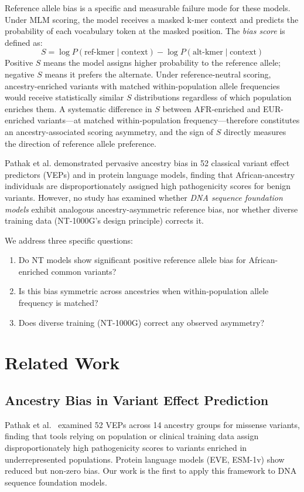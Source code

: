 \documentclass[conference]{IEEEtran}
\begin{document}
Reference allele bias is a specific and measurable failure mode for these
models. Under MLM scoring, the model receives a masked k-mer context and
predicts the probability of each vocabulary token at the masked position. The
\emph{bias score} is defined as:
\begin{equation}
  S = \log P(\text{ref-kmer} \mid \text{context})
      - \log P(\text{alt-kmer} \mid \text{context})
  \label{eq:bias}
\end{equation}
Positive $S$ means the model assigns higher probability to the reference
allele; negative $S$ means it prefers the alternate. Under reference-neutral
scoring, ancestry-enriched variants with matched within-population allele
frequencies would receive statistically similar $S$ distributions regardless
of which population enriches them. A systematic difference in $S$ between
AFR-enriched and EUR-enriched variants---at matched within-population
frequency---therefore constitutes an ancestry-associated scoring asymmetry,
and the sign of $S$ directly measures the direction of reference allele
preference.

Pathak et al. \cite{pathak_2024} demonstrated pervasive ancestry bias in 52
classical variant effect predictors (VEPs) and in protein language models,
finding that African-ancestry individuals are disproportionately assigned high
pathogenicity scores for benign variants. However, no study has examined whether
\emph{DNA sequence foundation models} exhibit analogous ancestry-asymmetric
reference bias, nor whether diverse training data (NT-1000G's design principle)
corrects it.

We address three specific questions:
\begin{enumerate}
  \item Do NT models show significant positive reference allele bias for
        African-enriched common variants?
  \item Is this bias symmetric across ancestries when within-population allele
        frequency is matched?
  \item Does diverse training (NT-1000G) correct any observed asymmetry?
\end{enumerate}

\section{Related Work}

\subsection{Ancestry Bias in Variant Effect Prediction}
Pathak et al.~\cite{pathak_2024} examined 52 VEPs across 14 ancestry groups
for missense variants, finding that tools relying on population or clinical
training data assign disproportionately high pathogenicity scores to variants
enriched in underrepresented populations. Protein language models (EVE, ESM-1v)
show reduced but non-zero bias. Our work is the first to apply this framework
to DNA sequence foundation models.
\end{document}
